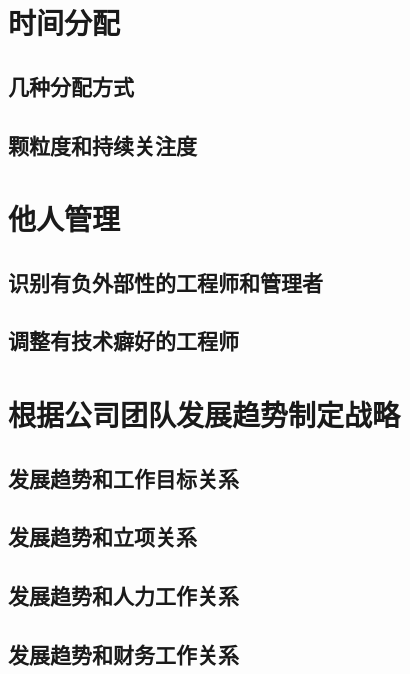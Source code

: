 
\section{时间分配}
\subsection{几种分配方式} %
\subsection{颗粒度和持续关注度}

\section{他人管理}
\subsection{识别有负外部性的工程师和管理者}
\subsection{调整有技术癖好的工程师} %

\section{根据公司团队发展趋势制定战略}
\subsection{发展趋势和工作目标关系}
\subsection{发展趋势和立项关系}
\subsection{发展趋势和人力工作关系}
\subsection{发展趋势和财务工作关系}

